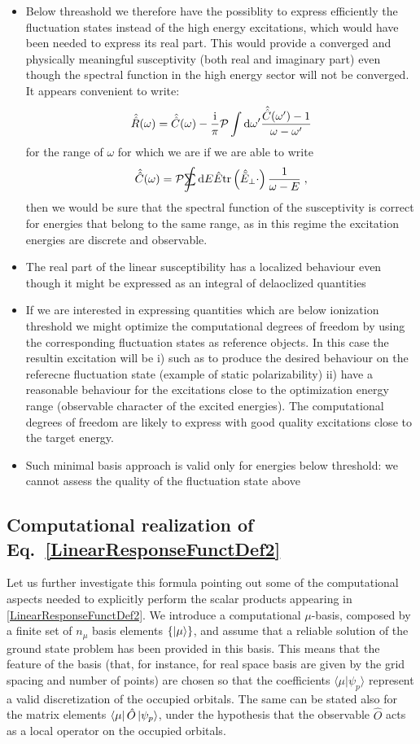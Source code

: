 \documentclass[a4paper]{article}
\newcommand{\dd}{{\rm d}}
\newcommand{\ii}{\mathrm{i}}
\newcommand{\sint}{\mathrlap{\displaystyle\int}
\mathrlap{\textstyle\sum}
\phantom{\mathrlap{\displaystyle
\int}\textstyle\sum}}
\newcommand{\be}{\begin{equation}}
\newcommand{\ee}{\end{equation}}
\newcommand{\op}[1]{\hat {#1}}
\newcommand{\sop}[1]{\op{\op {#1}}}
\newcommand{\trace}[1]{\mathrm{tr}\left(#1\right)}
\newcommand{\brket}[2]{\langle  #1 | #2 \rangle} %
\begin{document}
\begin{itemize}
\begin{itemize}
\item Below threashold we therefore have the possiblity to express efficiently the fluctuation states instead of the high energy excitations, which would have been needed to express its real part. This would provide a converged and physically meaningful susceptivity (both real and imaginary part) even though the spectral function in the high energy sector will not be converged.
It appears convenient to write:
\be
\sop R(\omega)= \sop C(\omega) - \frac{\ii}{\pi}\mathcal P \int \dd \omega' \frac{\sop C(\omega')-1}{\omega -\omega'}
\ee
for the range of $\omega$ for which we are if we are able to write
\be
\sop C(\omega) = \mathcal P \sint \dd E   \op E \trace{\op{\tilde E}_\perp \cdot } \frac{1}{\omega -E }\;,
\ee
then we would be sure that the spectral function of the susceptivity is correct for energies that belong to the same range, as in this regime the excitation energies are discrete and observable.
\item The real part of the linear susceptibility has a localized behaviour even though it might be expressed as an integral of delaoclized quantities
\item If we are interested in expressing quantities which are below ionization threshold we might optimize the computational degrees of freedom by using the corresponding fluctuation states as reference objects. In this case the resultin excitation will be i) such as to produce the desired behaviour on the referecne fluctuation state (example of static polarizability) ii) have a reasonable behaviour for the excitations close to the optimization energy range (observable character of the excited energies). The computational degrees of freedom are likely to express with good quality excitations close to the target energy.
\item Such minimal basis approach is valid only for energies below threshold: we cannot assess the quality of the fluctuation state above 
\end{itemize}

\end{itemize}

\subsection{Computational realization of Eq.~\eqref{LinearResponseFunctDef2}}
Let us further investigate this formula pointing out some of the  computational aspects needed to explicitly perform the scalar products appearing in 
\eqref{LinearResponseFunctDef2}. 
We introduce a computational $\mu$-basis, composed by a finite set of $n_\mu$ basis elements $\{\ket{\mu}\}$, and assume that a reliable solution of the ground state problem has 
been provided in this basis. This means that the feature of the basis (that, for instance, for real space basis are given by the grid spacing and number of points) are chosen so 
that the coefficients $\brket{\mu}{\psi_p}$ represent a valid discretization of the occupied orbitals. The same can be stated also for the matrix elements $\bra{\mu}\op O\ket{\psi_p}$, 
under the hypothesis that the observable $\op O$ acts as a local operator on the occupied orbitals.  
\end{document}
